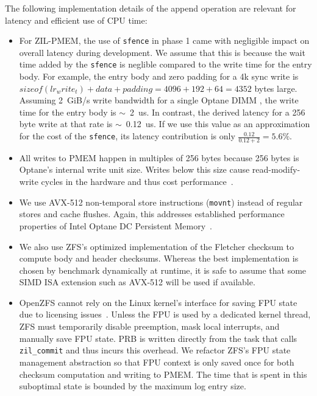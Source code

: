 \documentclass[12pt,a4paper,twoside]{book}
\begin{document}
The following implementation details of the append operation are relevant for latency and efficient use of CPU time:
\begin{itemize}[noitemsep]
    \item For ZIL-PMEM, the use of \lstinline{sfence} in phase 1 came with negligible impact on overall latency during development.
        We assume that this is because the wait time added by the \lstinline{sfence} is neglible compared to the write time for the entry body.
        For example, the entry body and zero padding for a 4k sync write is $sizeof(lr_write_t) + data + padding = 4096 + 192 + 64 = 4352$ bytes large.
        Assuming 2~GiB/s write bandwidth for a single Optane DIMM \cite{yangEmpiricalGuideBehavior2020}, the write time for the entry body is $\sim$~2~us.
        In contrast, the derived latency for a 256 byte write at that rate is $\sim$~0.12~us.
        If we use this value as an approximation for the cost of the \lstinline{sfence}, its latency contribution is only $\frac{0.12}{0.12 + 2} = 5.6\%$.
    \item All writes to PMEM happen in multiples of 256 bytes because 256 bytes is Optane's internal write unit size.
        Writes below this size cause read-modify-write cycles in the hardware and thus cost performance~\cite{yangEmpiricalGuideBehavior2020,zhangChameleonDBKeyvalueStore2021}.
    \item We use AVX-512 non-temporal store instructions (\lstinline{movnt}) instead of regular stores and cache flushes.
        Again, this addresses established performance properties of Intel Optane DC Persistent Memory~\cite{yangEmpiricalGuideBehavior2020}.
    \item We also use ZFS's optimized implementation of the Fletcher checksum to compute body and header checksums.
        Whereas the best implementation is chosen by benchmark dynamically at runtime, it is safe to assume that some SIMD ISA extension such as AVX-512 will be used if available.
    \item OpenZFS cannot rely on the Linux kernel's interface for saving FPU state due to licensing issues~\cite{LinuxCompatSIMD}.
        Unless the FPU is used by a dedicated kernel thread, ZFS must temporarily disable preemption, mask local interrupts, and manually save FPU state.
        PRB is written directly from the task that calls \lstinline{zil_commit} and thus incurs this overhead.
        We refactor ZFS's FPU state management abstraction so that FPU context is only saved once for both checksum computation and writing to PMEM.
        The time that is spent in this suboptimal state is bounded by the maximum log entry size.
\end{itemize}
\end{document}
